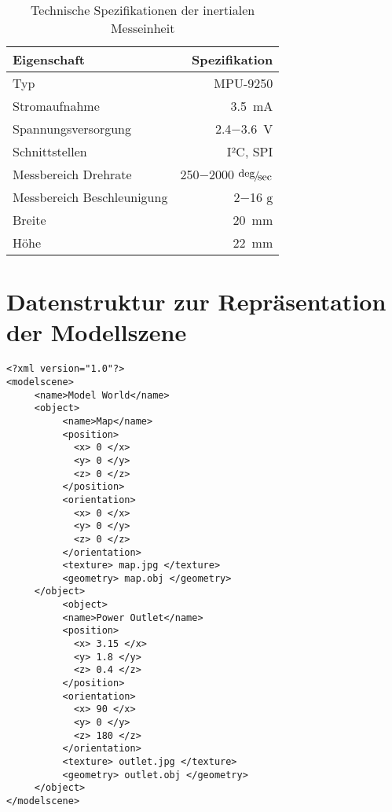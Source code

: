 \begin{table}[ht]
\begin{center}
\setlength{\tabcolsep}{20pt}
\begin{tabular}{lr}
\toprule
Eigenschaft & Spezifikation \\
\midrule
Typ & MPU-9250 \\ \addlinespace
Stromaufnahme & \SI{3,5}{\milli\ampere} \\ \addlinespace
Spannungsversorgung & \SI{2,4}{}$-$\SI{3,6}{\volt} \\ \addlinespace
Schnittstellen & I²C, SPI \\ \addlinespace
Messbereich Drehrate & \SI{250}{}$-$\SI{2000}{} $\nicefrac{\deg}{\sec}$\\ \addlinespace
Messbereich Beschleunigung &  \SI{2}{}$-$\SI{16}{} $\mathrm{g}$\\ \addlinespace
Breite & \SI{20}{\milli\meter} \\ \addlinespace
Höhe & \SI{22}{\milli\meter}\\
\bottomrule
\end{tabular}
\caption{Technische Spezifikationen der inertialen Messeinheit}
\end{center}
\label{tab:imu}
\end{table}

\clearpage{}

\section{Datenstruktur zur Repräsentation der Modellszene}
\label{app.datastructure}
\begin{lstlisting}[label=source.data,caption=Datenstruktur zur Repräsentation der Modellszene]
<?xml version="1.0"?>
<modelscene>
     <name>Model World</name>
     <object>
          <name>Map</name>
          <position>
          	<x> 0 </x>
          	<y> 0 </y>
          	<z> 0 </z>
          </position>
          <orientation>
          	<x> 0 </x>
          	<y> 0 </y>
          	<z> 0 </z>
          </orientation>
          <texture> map.jpg </texture>
          <geometry> map.obj </geometry>
     </object>
          <object>
          <name>Power Outlet</name>
          <position>
          	<x> 3.15 </x>
          	<y> 1.8 </y>
          	<z> 0.4 </z>
          </position>
          <orientation>
          	<x> 90 </x>
          	<y> 0 </y>
          	<z> 180 </z>
          </orientation>
          <texture> outlet.jpg </texture>
          <geometry> outlet.obj </geometry>
     </object>
</modelscene>
\end{lstlisting}

\clearpage{}

%

%
%
